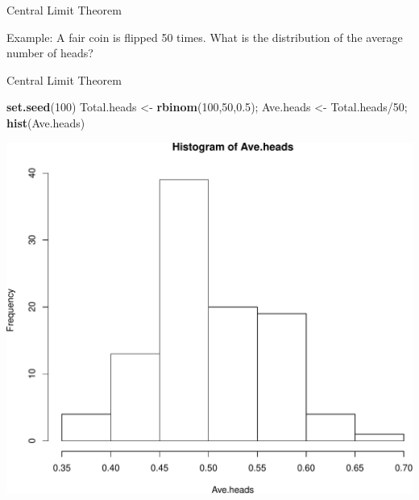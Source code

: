 \documentclass[9pt,ignorenonframetext,]{beamer}
\newenvironment{Shaded}{\begin{snugshade}}{\end{snugshade}}
\newcommand{\KeywordTok}[1]{\textcolor[rgb]{0.13,0.29,0.53}{\textbf{{#1}}}}
\newcommand{\DecValTok}[1]{\textcolor[rgb]{0.00,0.00,0.81}{{#1}}}
\newcommand{\FloatTok}[1]{\textcolor[rgb]{0.00,0.00,0.81}{{#1}}}
\newcommand{\StringTok}[1]{\textcolor[rgb]{0.31,0.60,0.02}{{#1}}}
\newcommand{\NormalTok}[1]{{#1}}
\begin{document}
\begin{frame}{Central Limit Theorem}

Example: A fair coin is flipped 50 times. What is the distribution of
the average number of heads?

\end{frame}

\begin{frame}[fragile]{Central Limit Theorem}

\begin{Shaded}
\begin{Highlighting}[]
\KeywordTok{set.seed}\NormalTok{(}\DecValTok{100}\NormalTok{)}
\NormalTok{Total.heads <-}\StringTok{ }\KeywordTok{rbinom}\NormalTok{(}\DecValTok{100}\NormalTok{,}\DecValTok{50}\NormalTok{,}\FloatTok{0.5}\NormalTok{); Ave.heads <-}\StringTok{ }\NormalTok{Total.heads/}\DecValTok{50}\NormalTok{; }
\KeywordTok{hist}\NormalTok{(Ave.heads)}
\end{Highlighting}
\end{Shaded}

\includegraphics{class2-jan11_files/figure-beamer/unnamed-chunk-10-1.pdf}

\end{frame}
\end{document}
